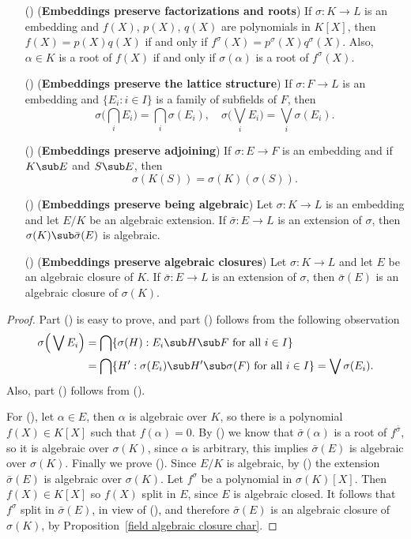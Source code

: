 \begin{proposition}\label{field embedding prop}
\mbox{}
\begin{itemize}
\item[(\rmnum{1})] (\textbf{Embeddings preserve factorizations and roots}) If $\sigma:K\to L$ is an embedding and $f(X)$, $p(X)$, $q(X)$ are polynomials in $K[X]$, then $f(X)=p(X)q(X)$ if and only if $f^\sigma(X)=p^\sigma(X)q^\sigma(X)$. Also, $\alpha\in K$ is a root of $f(X)$ if and only if $\sigma(\alpha)$ is a root of $f^\sigma(X)$.
\item[(\rmnum{2})] (\textbf{Embeddings preserve the lattice structure}) If $\sigma:F\to L$ is an embedding and $\{E_i:i\in I\}$ is a family of subfields of $F$, then
\[\sigma\Big(\bigcap_iE_i\Big)=\bigcap_i\sigma(E_i),\quad \sigma\Big(\bigvee_i E_i\Big)=\bigvee_i\sigma(E_i).\] 
\item[(\rmnum{3})] (\textbf{Embeddings preserve adjoining}) If $\sigma:E\to F$ is an embedding and if $K\sub E$ and $S\sub E$, then
\[\sigma(K(S))=\sigma(K)(\sigma(S)).\] 
\item[(\rmnum{4})] (\textbf{Embeddings preserve being algebraic}) Let $\sigma:K\to L$ is an embedding and let $E/K$ be an algebraic extension. If $\bar{\sigma}:E\to L$ is an extension of $\sigma$, then $\sigma(K)\sub\bar{\sigma}(E)$ is algebraic.
\item[(\rmnum{5})] (\textbf{Embeddings preserve algebraic closures}) Let $\sigma:K\to L$ and let $E$ be an algebraic closure of $K$. If $\bar{\sigma}:E\to L$ is an extension of $\sigma$, then $\bar{\sigma}(E)$ is an algebraic closure of $\sigma(K)$.  
\end{itemize}
\end{proposition}
\begin{proof}
Part () is easy to prove, and part () follows from the following observation
\begin{align*}
\sigma\Big(\bigvee E_i\Big)&=\bigcap\{\sigma(H):E_i\sub H\sub F\text{ for all $i\in I$}\}\\
&=\bigcap\{H':\sigma(E_i)\sub H'\sub\sigma(F)\text{ for all $i\in I$}\}=\bigvee\sigma(E_i).
\end{align*}
Also, part () follows from ().\par
For (), let $\alpha\in E$, then $\alpha$ is algebraic over $K$, so there is a polynomial $f(X)\in K[X]$ such that $f(\alpha)=0$. By () we know that $\bar{\sigma}(\alpha)$ is a root of $f^{\bar{\sigma}}$, so it is algebraic over $\sigma(K)$, since $\alpha$ is arbitrary, this implies $\bar{\sigma}(E)$ is algebraic over $\sigma(K)$. Finally we prove (). Since $E/K$ is algebraic, by () the extension $\bar{\sigma}(E)$ is algebraic over $\sigma(K)$. Let $f^\sigma$ be a polynomial in $\sigma(K)[X]$. Then $f(X)\in K[X]$ so $f(X)$ split in $E$, since $E$ is algebraic closed. It follows that $f^\sigma$ split in $\bar{\sigma}(E)$, in view of (), and therefore $\bar{\sigma}(E)$ is an algebraic closure of $\sigma(K)$, by Proposition~\ref{field algebraic closure char}. 
\end{proof}
